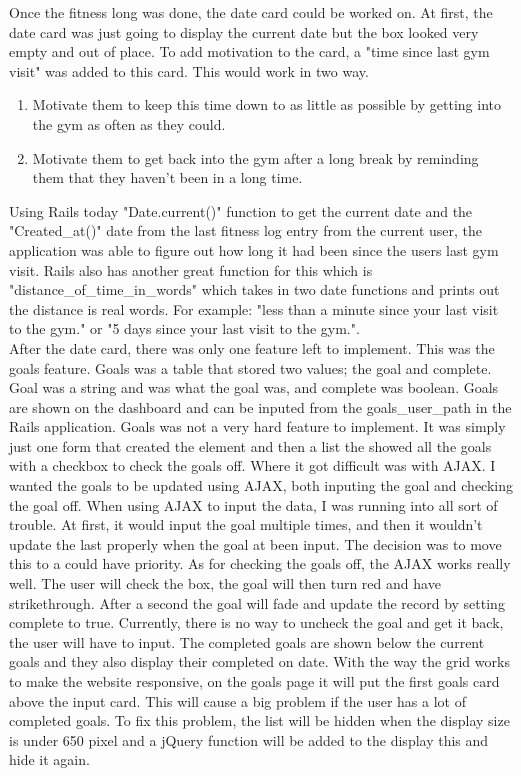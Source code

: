 Once the fitness long was done, the date card could be worked on. At first, the date card was just going to display the current date but the box looked very empty and out of place. To add motivation to the card, a "time since last gym visit" was added to this card. This would work in two way. 

\begin{enumerate}
\item Motivate them to keep this time down to as little as possible by getting into the gym as often as they could.
\item Motivate them to get back into the gym after a long break by reminding them that they haven't been in a long time.
\end{enumerate}

Using Rails today "Date.current()" function to get the current date and the "Created\_at()" date from the last fitness log entry from the current user, the application was able to figure out how long it had been since the users last gym visit. Rails also has another great function for this which is "distance\_of\_time\_in\_words" which takes in two date functions and prints out the distance is real words. For example: "less than a minute since your last visit to the gym." or "5 days since your last visit to the gym.".\\

After the date card, there was only one feature left to implement. This was the goals feature. Goals was a table that stored two values; the goal and complete. Goal was a string and was what the goal was, and complete was boolean. Goals are shown on the dashboard and can be inputed from the goals\_user\_path in the Rails application. Goals was not a very hard feature to implement. It was simply just one form that created the element and then a list the showed all the goals with a checkbox to check the goals off. Where it got difficult was with AJAX. I wanted the goals to be updated using AJAX, both inputing the goal and checking the goal off. When using AJAX to input the data, I was running into all sort of trouble. At first, it would input the goal multiple times, and then it wouldn't update the last properly when the goal at been input. The decision was to move this to a could have priority. As for checking the goals off, the AJAX works really well. The user will check the box, the goal will then turn red and have strikethrough. After a second the goal will fade and update the record by setting complete to true. Currently, there is no way to uncheck the goal and get it back, the user will have to input. The completed goals are shown below the current goals and they also display their completed on date. With the way the grid works to make the website responsive, on the goals page it will put the first goals card above the input card. This will cause a big problem if the user has a lot of completed goals. To fix this problem, the list will be hidden when the display size is under 650 pixel and a jQuery function will be added to the display this and hide it again.\\


